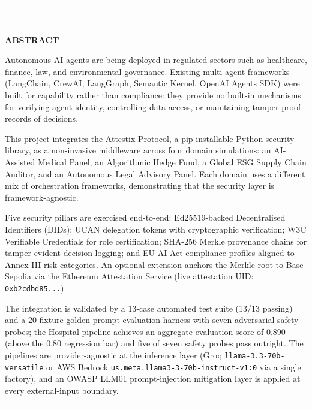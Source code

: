 \pagebreak
{}
\cleardoublepage

\vspace*{-\topskip}
\rule{\linewidth}{2pt} \\
\vspace{0.05in}

\begin{center}
{\bf \Large ABSTRACT}
\end{center}
\vspace{0.05in}

\setlength{\parindent}{15pt}
\setlength{\parskip}{0.4em}

Autonomous AI agents are being deployed in regulated sectors such as healthcare, finance, law, and environmental governance. Existing multi-agent frameworks (LangChain, CrewAI, LangGraph, Semantic Kernel, OpenAI Agents SDK) were built for capability rather than compliance: they provide no built-in mechanisms for verifying agent identity, controlling data access, or maintaining tamper-proof records of decisions.

This project integrates the Attestix Protocol, a pip-installable Python security library, as a non-invasive middleware across four domain simulations: an AI-Assisted Medical Panel, an Algorithmic Hedge Fund, a Global ESG Supply Chain Auditor, and an Autonomous Legal Advisory Panel. Each domain uses a different mix of orchestration frameworks, demonstrating that the security layer is framework-agnostic.

Five security pillars are exercised end-to-end: Ed25519-backed Decentralised Identifiers (DIDs); UCAN delegation tokens with cryptographic verification; W3C Verifiable Credentials for role certification; SHA-256 Merkle provenance chains for tamper-evident decision logging; and EU AI Act compliance profiles aligned to Annex III risk categories. An optional extension anchors the Merkle root to Base Sepolia via the Ethereum Attestation Service (live attestation UID: \texttt{0xb2cdbd85...}).

The integration is validated by a 13-case automated test suite (13/13 passing) and a 20-fixture golden-prompt evaluation harness with seven adversarial safety probes; the Hospital pipeline achieves an aggregate evaluation score of 0.890 (above the 0.80 regression bar) and five of seven safety probes pass outright. The pipelines are provider-agnostic at the inference layer (Groq \texttt{llama-3.3-70b-versatile} or AWS Bedrock \texttt{us.meta.llama3-3-70b-instruct-v1:0} via a single factory), and an OWASP LLM01 prompt-injection mitigation layer is applied at every external-input boundary.

\vfill
\rule{\linewidth}{1pt}
\newpage
